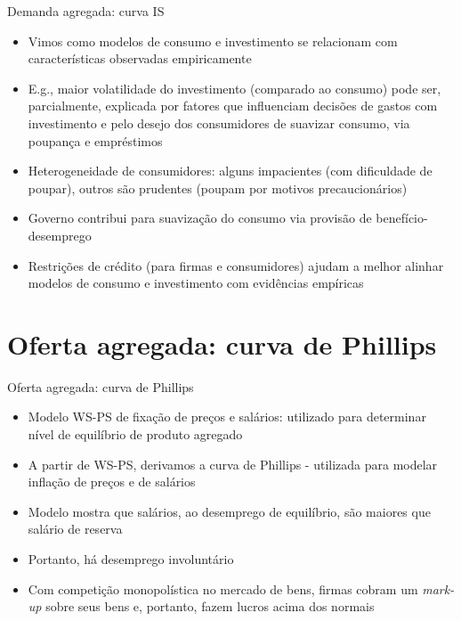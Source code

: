 \documentclass[10pt]{beamer}
\begin{document}
\begin{frame}
    {Demanda agregada: curva IS}
    \begin{itemize}
        \item Vimos como modelos de consumo e investimento se relacionam com características observadas empiricamente\bigskip
        \item E.g., maior volatilidade do investimento (comparado ao consumo) pode ser, parcialmente, explicada por fatores que influenciam decisões de gastos com investimento e pelo desejo dos consumidores de suavizar consumo, via poupança e empréstimos\bigskip
        \item Heterogeneidade de consumidores: alguns impacientes (com dificuldade de poupar), outros são prudentes (poupam por motivos precaucionários)\bigskip
        \item Governo contribui para suavização do consumo via provisão de benefício-desemprego\bigskip
        \item Restrições de crédito (para firmas e consumidores) ajudam a melhor alinhar modelos de consumo e investimento com evidências empíricas
    \end{itemize}
\end{frame}

\section{Oferta agregada: curva de Phillips}
\begin{frame}
    {Oferta agregada: curva de Phillips}
    \begin{itemize}
        \item Modelo WS-PS de fixação de preços e salários: utilizado para determinar nível de equilíbrio de produto agregado\bigskip
        \item A partir de WS-PS, derivamos a curva de Phillips - utilizada para modelar inflação de preços e de salários\bigskip
        \item Modelo mostra que salários, ao desemprego de equilíbrio, são maiores que salário de reserva\bigskip
        \item Portanto, há desemprego involuntário\bigskip
        \item Com competição monopolística no mercado de bens, firmas cobram um \emph{mark-up} sobre seus bens e, portanto, fazem lucros acima dos normais
    \end{itemize}
\end{frame}
\end{document}
